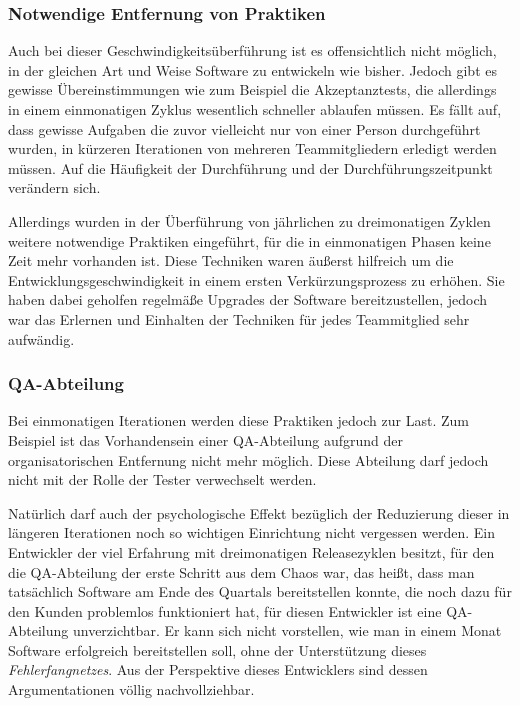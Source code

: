 \subsubsection{Notwendige Entfernung von Praktiken}
\label{minisec:monat-entfernte-praktiken}
Auch bei dieser Geschwindigkeitsüberführung ist es offensichtlich nicht
möglich, in der gleichen Art und Weise Software zu entwickeln wie bisher.
Jedoch gibt es gewisse Übereinstimmungen wie zum Beispiel die Akzeptanztests, die
allerdings in einem einmonatigen Zyklus wesentlich schneller ablaufen müssen.
Es fällt auf, dass  gewisse Aufgaben die zuvor vielleicht nur von einer Person
durchgeführt wurden, in kürzeren Iterationen von mehreren Teammitgliedern
erledigt werden müssen. Auf die Häufigkeit der Durchführung und der
Durchführungszeitpunkt verändern sich.

Allerdings wurden in der Überführung von jährlichen zu dreimonatigen Zyklen
weitere notwendige Praktiken eingeführt, für die in einmonatigen Phasen keine
Zeit mehr vorhanden ist. Diese Techniken waren äußerst hilfreich um die
Entwicklungsgeschwindigkeit in einem ersten Verkürzungsprozess zu erhöhen. Sie
haben dabei geholfen regelmäße Upgrades der Software bereitzustellen, jedoch
war das Erlernen und Einhalten der Techniken für jedes Teammitglied sehr
aufwändig.

\subsubsection{QA-Abteilung}
\label{minisec:qa-abteilung}

Bei einmonatigen Iterationen werden diese Praktiken jedoch zur Last. Zum Beispiel ist
das Vorhandensein einer QA-Abteilung aufgrund der organisatorischen Entfernung
nicht mehr möglich. Diese Abteilung darf jedoch nicht mit der Rolle der Tester
verwechselt werden.

Natürlich darf auch der psychologische Effekt bezüglich der Reduzierung
dieser in längeren Iterationen noch so wichtigen Einrichtung nicht vergessen
werden.  Ein Entwickler der viel Erfahrung mit dreimonatigen Releasezyklen
besitzt, für den die QA-Abteilung der erste Schritt aus dem Chaos war, das heißt,
dass man tatsächlich Software am Ende des Quartals bereitstellen konnte, die noch
dazu für den Kunden problemlos funktioniert hat, für diesen Entwickler ist
eine QA-Abteilung unverzichtbar. Er kann sich nicht vorstellen, wie man in
einem Monat Software erfolgreich bereitstellen soll, ohne der Unterstützung
dieses \emph{Fehlerfangnetzes}. Aus der Perspektive dieses Entwicklers sind
dessen Argumentationen völlig nachvollziehbar.

